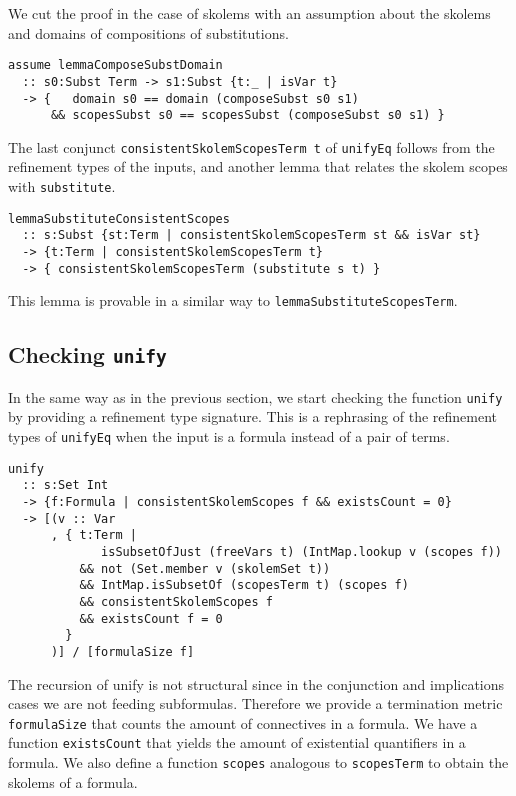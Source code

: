 \documentclass[sigconf, anonymous, review]{acmart}
\newcommand{\tc}[1]{{\small\texttt{#1}}}
\begin{document}
We cut the proof in the case of skolems with an assumption about the
skolems and domains of compositions of substitutions.
\begin{verbatim}
assume lemmaComposeSubstDomain
  :: s0:Subst Term -> s1:Subst {t:_ | isVar t}
  -> {   domain s0 == domain (composeSubst s0 s1)
      && scopesSubst s0 == scopesSubst (composeSubst s0 s1) }
\end{verbatim}

The last conjunct \tc{consistentSkolemScopesTerm t} of \tc{unifyEq} follows
from the refinement types of the inputs, and another lemma that relates
the skolem scopes with \tc{substitute}.
\begin{verbatim}
lemmaSubstituteConsistentScopes
  :: s:Subst {st:Term | consistentSkolemScopesTerm st && isVar st}
  -> {t:Term | consistentSkolemScopesTerm t}
  -> { consistentSkolemScopesTerm (substitute s t) }
\end{verbatim}
This lemma is provable in a similar way to \tc{lemmaSubstituteScopesTerm}.


\subsection{Checking \tc{unify}}
\label{checking-unify}

In the same way as in the previous section, we start checking the function \tc{unify}
by providing a refinement type signature. This is a rephrasing of the refinement
types of \tc{unifyEq} when the input is a formula instead of a pair of terms.

\begin{verbatim}
unify
  :: s:Set Int
  -> {f:Formula | consistentSkolemScopes f && existsCount = 0}
  -> [(v :: Var
      , { t:Term |
             isSubsetOfJust (freeVars t) (IntMap.lookup v (scopes f))
          && not (Set.member v (skolemSet t))
          && IntMap.isSubsetOf (scopesTerm t) (scopes f)
          && consistentSkolemScopes f
          && existsCount f = 0
        }
      )] / [formulaSize f]
\end{verbatim}

The recursion of unify is not structural since in the conjunction and implications
cases we are not feeding subformulas. Therefore we provide a termination
metric \tc{formulaSize} that counts the amount of connectives in a formula.
We have a function \tc{existsCount} that yields the amount of existential
quantifiers in a formula.
We also define a function \tc{scopes} analogous to \tc{scopesTerm} to obtain the skolems
of a formula.
\end{document}
